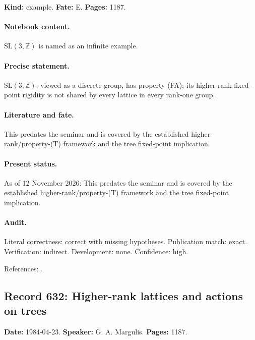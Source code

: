 \label{item:1983-633.5}

\noindent\textbf{Kind:} example. \textbf{Fate:} E. \textbf{Pages:} 1187.\par

\paragraph{Notebook content.} \(\mathrm{SL}(3,\mathbb Z)\) is named as an infinite example.

\paragraph{Precise statement.} \(\mathrm{SL}(3,\mathbb Z)\), viewed as a discrete group, has property (FA); its higher-rank fixed-point rigidity is not shared by every lattice in every rank-one group.

\paragraph{Literature and fate.} This predates the seminar and is covered by the established higher-rank/property-(T) framework and the tree fixed-point implication.

\paragraph{Present status.} As of 12 November 2026: This predates the seminar and is covered by the established higher-rank/property-(T) framework and the tree fixed-point implication.

\paragraph{Audit.} Literal correctness: correct with missing hypotheses. Publication match: exact. Verification: indirect. Development: none. Confidence: high.

\noindent References: \citep{serre1977arbres,bekkadelaharpevalette2008kazhdan}.\par

\subsection{Record 632: Higher-rank lattices and actions on trees}

\label{talk:632}

\noindent\textbf{Date:} 1984-04-23. \textbf{Speaker:} G. A. Margulis. \textbf{Pages:} 1187.\par

